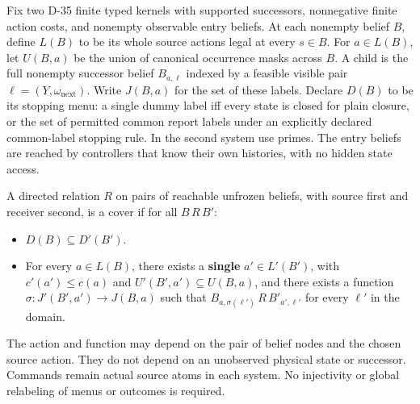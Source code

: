\begin{theorem}\label{ext:m012}

Fix two D-35 finite typed kernels with supported successors, nonnegative finite action costs, and nonempty observable entry beliefs. At each nonempty belief \(B\), define \(L(B)\) to be its whole source actions legal at every \(s\in B\). For \(a\in L(B)\), let \(U(B,a)\) be the union of canonical occurrence masks across \(B\). A child is the full nonempty successor belief \(B_{a,\ell}\) indexed by a feasible visible pair \(\ell=(Y,\omega_{\mathrm{next}})\). Write \(J(B,a)\) for the set of these labels. Declare \(D(B)\) to be its stopping menu: a single dummy label iff every state is closed for plain closure, or the set of permitted common report labels under an explicitly declared common-label stopping rule. In the second system use primes. The entry beliefs are reached by controllers that know their own histories, with no hidden state access.

A directed relation \(R\) on pairs of reachable unfrozen beliefs, with source first and receiver second, is a cover if for all \(B\,R\,B'\):

\begin{itemize}

\item
  \(D(B)\subseteq D'(B')\).
\item
  For every \(a\in L(B)\), there exists a \textbf{single} \(a'\in L'(B')\), with \(c'(a')\le c(a)\) and \(U'(B',a')\subseteq U(B,a)\), and there exists a function \(\sigma:J'(B',a')\to J(B,a)\) such that \(B_{a,\sigma(\ell')}\,R\,B'_{a',\ell'}\) for every \(\ell'\) in the domain.
\end{itemize}

The action and function may depend on the pair of belief nodes and the chosen source action. They do not depend on an unobserved physical state or successor. Commands remain actual source atoms in each system. No injectivity or global relabeling of menus or outcomes is required.


\end{theorem}
